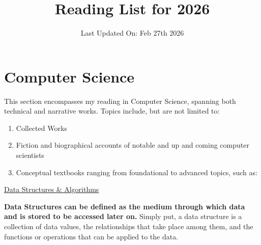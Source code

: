 \documentclass[10pt]{article}
\begin{document}
\title{Reading List for 2026}
\date{Last Updated On: Feb 27th 2026}
\maketitle

\fancyhf{}
\fancyhead[R]{\leftmark}
\fancyhead[C]{\thepage}

\renewcommand{\sectionmark}[1]{\markright{\textsf{\arabic{section}: #1}}}
\chead{}
\cfoot{}

\linespread{1.03} %
\setlength{\parindent}{0pt}
\setlength{\parskip}{6pt}
\setcounter{secnumdepth}{2} %
\setcounter{tocdepth}{2} %

\tableofcontents

\section{Computer Science}
This section encompasses my reading in Computer Science, 
spanning both technical and narrative works. Topics include, but are not limited to:
\begin{enumerate}
    \item Collected Works 
    \item Fiction and biographical accounts of notable and up and coming computer scientists
    \item Conceptual textbooks ranging from foundational to advanced topics, such as: \\
\end{enumerate}

\underline {Data Structures \& Algorithms }

\textbf{Data Structures can be defined as the medium through which data and is stored to be 
accessed later on.} Simply put, a data structure is a collection of data values, the relationships that take place among them, and 
the functions or operations that can be applied to the data. 
\end{document}

